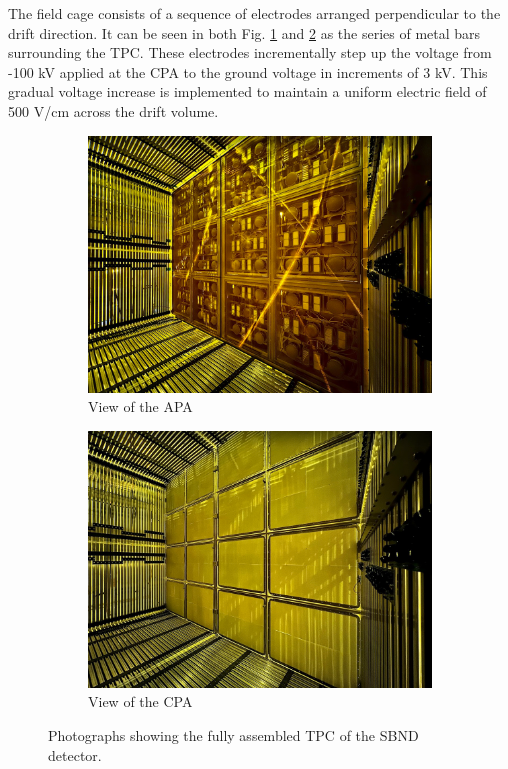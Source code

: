 The field cage consists of a sequence of electrodes arranged perpendicular to the drift direction.
It can be seen in both Fig. \ref{fig:SBND_APA} and \ref{fig:SBND_CPA} as the series of metal bars surrounding the TPC.
These electrodes incrementally step up the voltage from -100 kV applied at the CPA to the ground voltage in increments of 3 kV. 
This gradual voltage increase is implemented to maintain a uniform electric field of 500 V/cm across the drift volume.

\begin{figure}[htbp!]
\begin{subfigure}[h]{0.5\linewidth}
\centering    
\includegraphics[width=\linewidth]{SBND_APA_PDS}
\caption{View of the APA}
\label{fig:SBND_APA}
\end{subfigure}%
\hfill
\begin{subfigure}[h]{0.5\linewidth}
\centering    
\includegraphics[width=\linewidth]{SBND_CPA}
\caption{View of the CPA}
\label{fig:SBND_CPA}
\end{subfigure}
\caption[Time Projection Chamber Photographs]{
Photographs showing the fully assembled TPC of the SBND detector. 
}
\label{fig:SBND_CPA_APA}
\end{figure}

